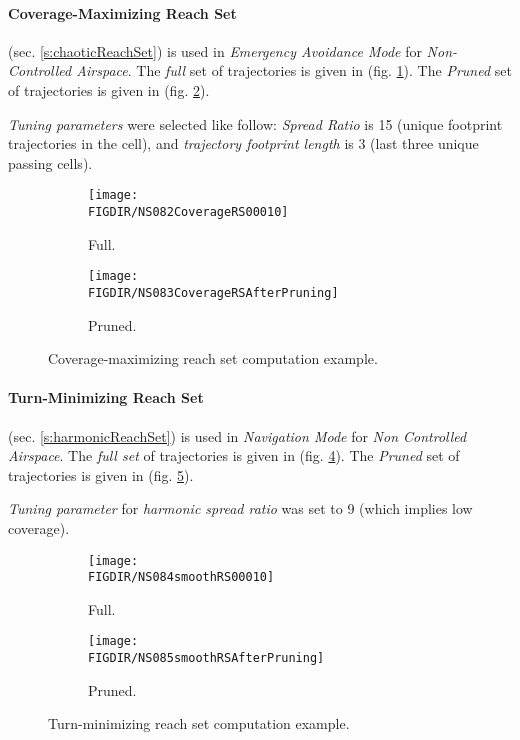 \paragraph{Coverage-Maximizing Reach Set} (sec. \ref{s:chaoticReachSet}) is used in \emph{Emergency Avoidance Mode} for \emph{Non-Controlled Airspace}. The \emph{full} set of trajectories is given in (fig. \ref{fig:chaoticComputed}). The \emph{Pruned} set of trajectories is given in (fig. \ref{fig:chaoticPruned}).

\emph{Tuning parameters} were selected like follow: \emph{Spread Ratio} is 15 (unique footprint trajectories in the cell), and \emph{trajectory footprint length} is $3$ (last three unique passing cells). 


\begin{figure}[H]
    \centering
    \begin{subfigure}{0.48\textwidth}
    	\centering
        \texttt{[image: \\FIGDIR/NS082CoverageRS00010]}
        \caption{Full.}
        \label{fig:chaoticComputed}
    \end{subfigure}
    \begin{subfigure}{0.48\textwidth}
    	\centering
        \texttt{[image: \\FIGDIR/NS083CoverageRSAfterPruning]} 
        \caption{Pruned.}
        \label{fig:chaoticPruned}
    \end{subfigure}
    \caption{Coverage-maximizing reach set computation example.}
    \label{fig:chaoticReachSetComputationExample}
\end{figure}

\paragraph{Turn-Minimizing Reach Set} (sec. \ref{s:harmonicReachSet}) is used in \emph{Navigation Mode} for \emph{Non Controlled Airspace}. The \emph{full set} of trajectories is given in (fig. \ref{fig:harmonicComputed}). The \emph{Pruned} set of trajectories is given in (fig. \ref{fig:harmonicPruned}).

\emph{Tuning parameter} for \emph{harmonic spread ratio} was set to 9 (which implies low coverage).

\begin{figure}[H]
    \centering
    \begin{subfigure}{0.48\textwidth}
    	\centering
        \texttt{[image: \\FIGDIR/NS084smoothRS00010]}
        \caption{Full.}
        \label{fig:harmonicComputed}
    \end{subfigure}
    \begin{subfigure}{0.48\textwidth}
    	\centering
        \texttt{[image: \\FIGDIR/NS085smoothRSAfterPruning]} 
        \caption{Pruned.}
        \label{fig:harmonicPruned}
    \end{subfigure}
    \caption{Turn-minimizing reach set computation example.}
    \label{fig:harmonicReachSetComputationExample}
\end{figure}

